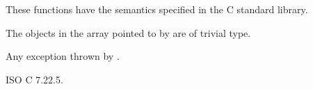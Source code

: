 \begin{itemdescr}
\pnum
\effects
These functions have the semantics specified in the C standard library.

\pnum
\expects
The objects in the array pointed to by  are of trivial type.

\pnum
\throws
Any exception thrown by .
\end{itemdescr}

\xref
ISO C 7.22.5.
